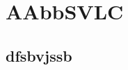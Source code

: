\documentclass[UTF8]{book}
\begin{document}
\chapter{AAbbSVLC}
\lipsum[1]
\section{dfsbvjssb}
\lipsum[1]
\end{document}
